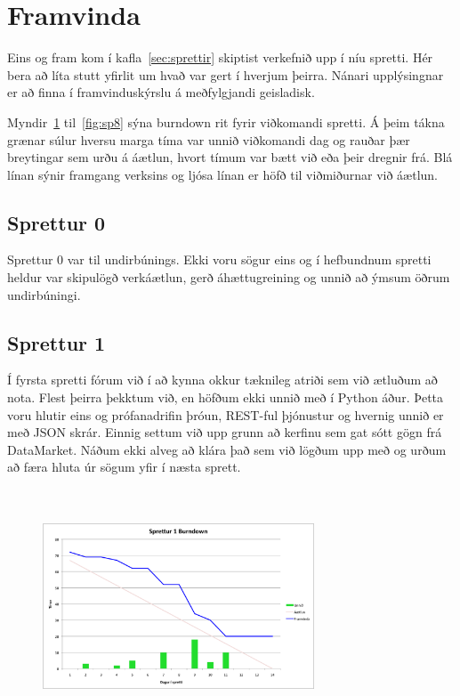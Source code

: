 \documentclass{article}
\begin{document}
\section{Framvinda}
Eins og fram kom í kafla~\ref{sec:sprettir} skiptist verkefnið upp í níu spretti. 
Hér bera að líta stutt yfirlit um hvað var gert í hverjum þeirra. Nánari upplýsingnar 
er að finna í framvinduskýrslu á meðfylgjandi geisladisk.

Myndir~\ref{fig:sp1} til~\ref{fig:sp8} 
sýna burndown rit fyrir viðkomandi spretti. Á þeim tákna grænar súlur hversu marga tíma var 
unnið viðkomandi dag og rauðar þær breytingar sem urðu á áætlun, hvort tímum var bætt við eða 
þeir dregnir frá. Blá línan sýnir framgang verksins og ljósa línan er höfð til viðmiðurnar 
við áætlun.

\subsection{Sprettur 0}
Sprettur 0 var til undirbúnings. Ekki voru sögur eins og í
hefbundnum spretti heldur var skipulögð verkáætlun, gerð áhættugreining og unnið að ýmsum öðrum
undirbúningi.
\subsection{Sprettur 1}
Í fyrsta spretti fórum við í að kynna okkur tæknileg atriði sem við ætluðum að
nota.
Flest þeirra þekktum við, en höfðum ekki unnið með í Python áður. Þetta voru hlutir
eins og prófanadrifin þróun, REST-ful þjónustur og hvernig 
unnið er með JSON skrár. Einnig settum við upp grunn að kerfinu sem gat sótt
gögn frá DataMarket. Náðum ekki alveg að klára það sem við lögðum 
upp með og urðum að færa hluta úr sögum yfir í næsta sprett.
\hfil \\
\hfil \\
\hfil \\
\begin{figure}[H]
  \centering
  \includegraphics[width=0.72\textwidth]{Sprettur1_Burndown.png}
  \caption{}
  \label{fig:sp1}
\end{figure}
\newpage
\end{document}
